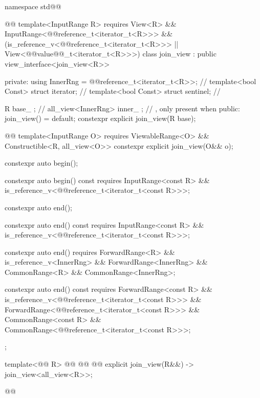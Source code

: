 \begin{codeblock}
namespace std@@ { @@
  template<InputRange R>
    requires View<R> && InputRange<@@reference_t<iterator_t<R>>> &&
      (is_reference_v<@@reference_t<iterator_t<R>>> ||
      View<@@value@@_t<iterator_t<R>>>)
  class join_view : public view_interface<join_view<R>> {
  private:
    using InnerRng = @@reference_t<iterator_t<R>>; // \expos
    template<bool Const>
      struct iterator; // \expos
    template<bool Const>
      struct sentinel; // \expos

    R base_ {}; // \expos
    all_view<InnerRng> inner_ {}; // \expos, only present when 
  public:
    join_view() = default;
    constexpr explicit join_view(R base);

    @@
    template<InputRange O>
        requires ViewableRange<O> && Constructible<R, all_view<O>>
      constexpr explicit join_view(O&& o);

    constexpr auto begin();

    constexpr auto begin() const requires InputRange<const R> &&
      is_reference_v<@@reference_t<iterator_t<const R>>>;

    constexpr auto end();

    constexpr auto end() const requires InputRange<const R> &&
      is_reference_v<@@reference_t<iterator_t<const R>>>;

    constexpr auto end() requires ForwardRange<R> &&
      is_reference_v<InnerRng> && ForwardRange<InnerRng> &&
      CommonRange<R> && CommonRange<InnerRng>;

    constexpr auto end() const requires ForwardRange<const R> &&
      is_reference_v<@@reference_t<iterator_t<const R>>> &&
      ForwardRange<@@reference_t<iterator_t<const R>>> &&
      CommonRange<const R> && CommonRange<@@reference_t<iterator_t<const R>>>;
  };

  template<@@ R>
    @@
      @@
      @@
    explicit join_view(R&&) -> join_view<all_view<R>>;
}@\oldtxt{\}}@
\end{codeblock}

